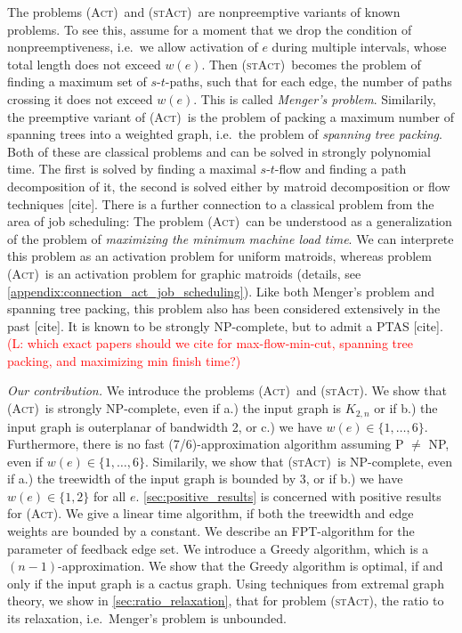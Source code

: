\documentclass[runningheads]{llncs}
\numberwithin{equation}{section}
\newcommand{\set}[1]{\{ #1 \}}
\newcommand{\fromto}[2]{\set{#1, \ldots, #2}}
\newcommand{\comment}[1]{\textcolor{red}{(L: #1)}}
\newcommand{\act}{\textsc{(Act)}}
\newcommand{\stact}{\textsc{(stAct)}}
\begin{document}
The problems \act\ and \stact\ are nonpreemptive variants of known problems. To see this, assume for a moment that we drop the condition of nonpreemptiveness, i.e.\ we allow activation of $e$ during multiple intervals, whose total length does not exceed $w(e)$. Then \stact\ becomes the problem of finding a maximum set of $s$-$t$-paths, such that for each edge, the number of paths crossing it does not exceed $w(e)$. This is called \emph{Menger's problem}. Similarily, the preemptive variant of \act\ is the problem of packing a maximum number of spanning trees into a weighted graph, i.e.\ the problem of \emph{spanning tree packing}. Both of these are classical problems and can be solved in strongly polynomial time. The first is solved by finding a maximal $s$-$t$-flow and finding a path decomposition of it, the second is solved either by matroid decomposition or flow techniques [cite]. There is a further connection to a classical problem from the area of job scheduling: The problem \act\ can be understood as a generalization of the problem of \emph{maximizing the minimum machine load time}. We can interprete this problem as an activation problem for uniform matroids, whereas problem \act\ is an activation problem for graphic matroids (details, see \cref{appendix:connection_act_job_scheduling}). Like both Menger's problem and spanning tree packing, this problem also has been considered extensively in the past [cite]. It is known to be strongly NP-complete, but to admit a PTAS [cite]. \comment{which exact papers should we cite for max-flow-min-cut, spanning tree packing, and maximizing min finish time?}

\emph{Our contribution.}
We introduce the problems \act\ and \stact. We show that \act\ is strongly NP-complete, even if a.) the input graph is $K_{2,n}$ or if b.) the input graph is outerplanar of bandwidth 2, or c.) we have $w(e) \in \fromto{1}{6}$. Furthermore, there is no fast (7/6)-approximation algorithm assuming P $\neq$ NP, even if $w(e) \in \fromto{1}{6}$. Similarily, we show that \stact\ is NP-complete, even if a.) the treewidth of the input graph is bounded by 3, or if b.) we have $w(e) \in \set{1,2}$ for all $e$. 
\cref{sec:positive_results} is concerned with positive results for \act. We give a linear time algorithm, if both the treewidth and edge weights are bounded by a constant. We describe an FPT-algorithm for the parameter of feedback edge set. We introduce a Greedy algorithm, which is a $(n-1)$-approximation. We show that the Greedy algorithm is optimal, if and only if the input graph is a cactus graph. Using techniques from extremal graph theory, we show in \cref{sec:ratio_relaxation}, that for problem \stact, the ratio to its relaxation, i.e.\ Menger's problem is unbounded.
\end{document}
